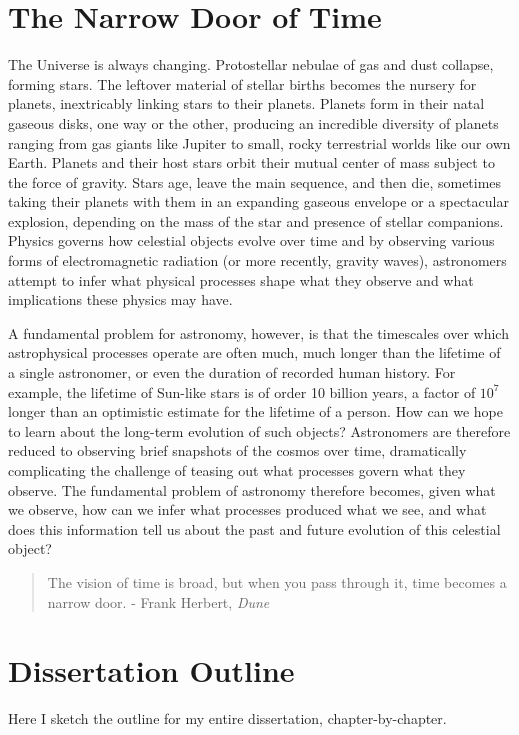
\section{The Narrow Door of Time}

The Universe is always changing. Protostellar nebulae of gas and dust collapse, forming stars. The leftover material of stellar births becomes the nursery for planets, inextricably linking stars to their planets. Planets form in their natal gaseous disks, one way or the other, producing an incredible diversity of planets ranging from gas giants like Jupiter to small, rocky terrestrial worlds like our own Earth. Planets and their host stars orbit their mutual center of mass subject to the force of gravity. Stars age, leave the main sequence, and then die, sometimes taking their planets with them in an expanding gaseous envelope or a spectacular explosion, depending on the mass of the star and presence of stellar companions. Physics governs how celestial objects evolve over time and by observing various forms of electromagnetic radiation (or more recently, gravity waves), astronomers attempt to infer what physical processes shape what they observe and what implications these physics may have.

A fundamental problem for astronomy, however, is that the timescales over which astrophysical processes operate are often much, much longer than the lifetime of a single astronomer, or even the duration of recorded human history. For example, the lifetime of Sun-like stars is of order 10 billion years, a factor of $10^7$ longer than an optimistic estimate for the lifetime of a person. How can we hope to learn about the long-term evolution of such objects? Astronomers are therefore reduced to observing brief snapshots of the cosmos over time, dramatically complicating the challenge of teasing out what processes govern what they observe. The fundamental problem of astronomy therefore becomes, given what we observe, how can we infer what processes produced what we see, and what does this information tell us about the past and future evolution of this celestial object? 

\begin{quotation}
The vision of time is broad, but when you pass through it, time becomes a narrow door. - Frank Herbert, \textit{Dune}
\end{quotation}

\section{Dissertation Outline}

Here I sketch the outline for my entire dissertation, chapter-by-chapter.
